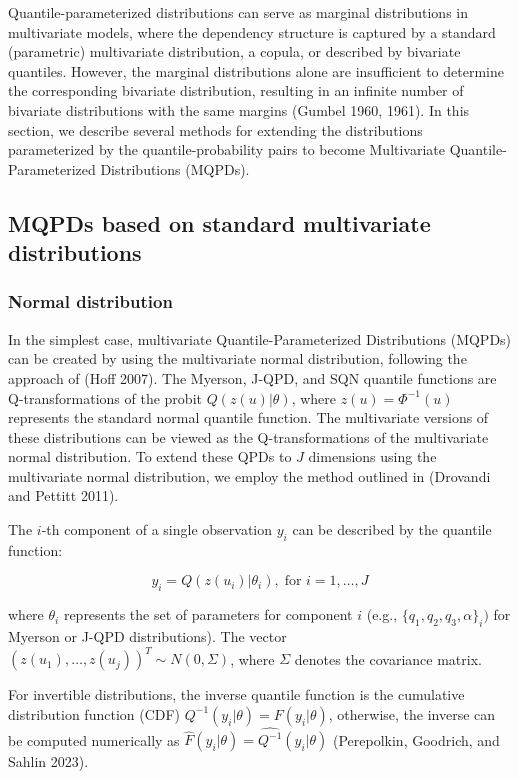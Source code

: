 \documentclass[
]{interact}
\begin{document}
Quantile-parameterized distributions can serve as marginal distributions
in multivariate models, where the dependency structure is captured by a
standard (parametric) multivariate distribution, a copula, or described
by bivariate quantiles. However, the marginal distributions alone are
insufficient to determine the corresponding bivariate distribution,
resulting in an infinite number of bivariate distributions with the same
margins (Gumbel 1960, 1961). In this section, we describe several
methods for extending the distributions parameterized by the
quantile-probability pairs to become Multivariate Quantile-Parameterized
Distributions (MQPDs).

\subsection{MQPDs based on standard multivariate
distributions}\label{mqpds-based-on-standard-multivariate-distributions}

\subsubsection{Normal distribution}\label{normal-distribution}

In the simplest case, multivariate Quantile-Parameterized Distributions
(MQPDs) can be created by using the multivariate normal distribution,
following the approach of (Hoff 2007). The Myerson, J-QPD, and SQN
quantile functions are Q-transformations of the probit
\(Q(z(u)\vert\theta)\), where \(z(u)=\Phi^{-1}(u)\) represents the
standard normal quantile function. The multivariate versions of these
distributions can be viewed as the Q-transformations of the multivariate
normal distribution. To extend these QPDs to \(J\) dimensions using the
multivariate normal distribution, we employ the method outlined in
(Drovandi and Pettitt 2011).

The \(i\)-th component of a single observation \(y_i\) can be described
by the quantile function:

\[
y_i=Q(z(u_i)\vert\theta_i), \; \text{for }i=1,\dots,J 
\]

where \(\theta_i\) represents the set of parameters for component \(i\)
(e.g., \(\{q_1,q_2,q_3, \alpha\}_i)\) for Myerson or J-QPD
distributions). The vector \((z(u_1),\dots,z(u_j))^T\sim N(0,\Sigma)\),
where \(\Sigma\) denotes the covariance matrix.

For invertible distributions, the inverse quantile function is the
cumulative distribution function (CDF)
\(Q^{-1}(y_i\vert\theta)=F(y_i\vert\theta)\), otherwise, the inverse can
be computed numerically as
\(\widehat{F}(y_i\vert\theta)=\widehat{Q^{-1}}(y_i\vert\theta)\)
(Perepolkin, Goodrich, and Sahlin 2023).
\end{document}
